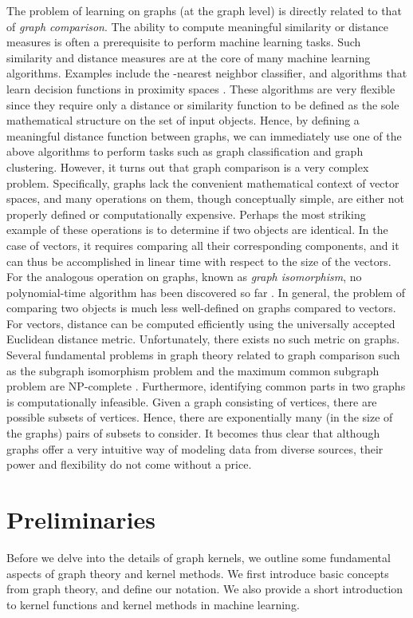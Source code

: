 \documentclass[twoside,11pt]{article}
\begin{document}
The problem of learning on graphs (at the graph level) is directly related to that of \textit{graph comparison}.
The ability to compute meaningful similarity or distance measures is often a prerequisite to perform machine learning tasks.
Such similarity and distance measures are at the core of many machine learning algorithms.
Examples include the -nearest neighbor classifier, and algorithms that learn decision functions in proximity spaces .
These algorithms are very flexible since they require only a distance or similarity function to be defined as the sole mathematical structure on the set of input objects.
Hence, by defining a meaningful distance function  between graphs, we can immediately use one of the above algorithms to perform tasks such as graph classification and graph clustering.
However, it turns out that graph comparison is a very complex problem.
Specifically, graphs lack the convenient mathematical context of vector spaces, and many operations on them, though conceptually simple, are either not properly defined or computationally expensive.
Perhaps the most striking example of these operations is to determine if two objects are identical.
In the case of vectors, it requires comparing all their corresponding components, and it can thus be accomplished in linear time with respect to the size of the vectors.
For the analogous operation on graphs, known as \textit{graph isomorphism}, no polynomial-time algorithm has been discovered so far .
In general, the problem of comparing two objects is much less well-defined on graphs compared to vectors.
For vectors, distance can be computed efficiently using the universally accepted Euclidean distance metric.
Unfortunately, there exists no such metric on graphs.
Several fundamental problems in graph theory related to graph comparison such as the subgraph isomorphism problem and the maximum common subgraph problem are NP-complete .
Furthermore, identifying common parts in two graphs is computationally infeasible.
Given a graph consisting of  vertices, there are  possible subsets of vertices.
Hence, there are exponentially many (in the size of the graphs) pairs of subsets to consider.
It becomes thus clear that although graphs offer a very intuitive way of modeling data from diverse sources, their power and flexibility do not come without a price.

\section{Preliminaries}\label{sec:preliminaries}
Before we delve into the details of graph kernels, we outline some fundamental aspects of graph theory and kernel methods. 
We first introduce basic concepts from graph theory, and define our notation.
We also provide a short introduction to kernel functions and kernel methods in machine learning.
\end{document}
